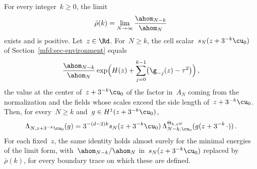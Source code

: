 \documentclass[11pt]{amsart}
\begin{document}
\begin{lemma}
\label{mfd:lem-local-normalizations}
For every integer~$k\geq0$, the limit
\begin{equation*}
	\bar\rho(k)=\lim_{N\to\infty}\frac{\ahom_{N-k}}{\ahom_N}
\end{equation*}
exists and is positive. Let~$z\in\Rd$. For~$N\geq k$, the cell scalar~$s_N(z+3^{-k}\cu_0)$ of Section~\ref{mfd:sec-environment} equals
\begin{equation*}
	\frac{\ahom_{N-k}}{\ahom_N}
	\exp\Bigl(H(z)+\sum_{j=0}^{k-1}\bigl(\g_{-j}(z)-\tau^2\bigr)\Bigr)\,,
\end{equation*}
the value at the center of~$z+3^{-k}\cu_0$ of the factor in~$A_N$ coming from the normalization and the fields whose scales exceed the side length of~$z+3^{-k}\cu_0$. Then, for every~$N\geq k$ and~$g\in H^1(z+3^{-k}\cu_0)$,
\begin{equation*}
	\Lambda_{N,z+3^{-k}\cu_0}(g)
	=3^{-(d-2)k}s_N(z+3^{-k}\cu_0)\,
	\Lambda_{N-k,\cu_0}^{\Theta_{k,z}\omega}(g(z+3^{-k}\,\cdot))\,.
\end{equation*}
For each fixed~$z$, the same identity holds almost surely for the minimal energies of the limit form, with~$\ahom_{N-k}/\ahom_N$ in~$s_N(z+3^{-k}\cu_0)$ replaced by~$\bar\rho(k)$, for every boundary trace on which these are defined.
\end{lemma}
\end{document}
